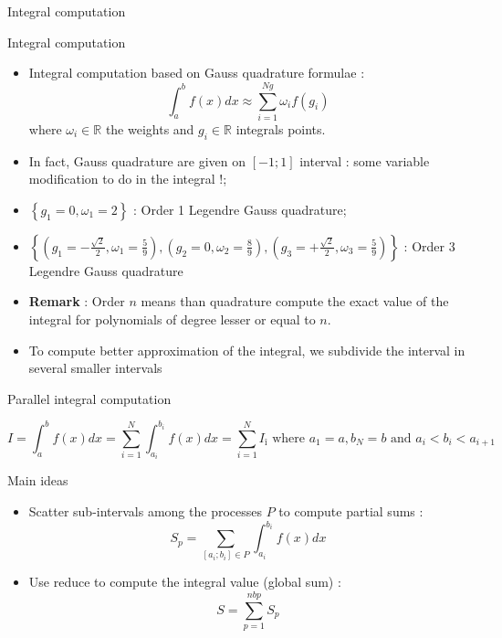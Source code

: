 \documentclass[compress,10pt,aspectratio=169]{beamer}
\begin{document}
\begin{frame}[fragile]{Integral computation}
  \scriptsize
  \begin{block}{\small Integral computation}
    \begin{itemize}
    \item Integral computation based on Gauss quadrature formulae :
      \[
      \int_{a}^{b}f(x)dx \approx \sum_{i=1}^{Ng} \omega_{i}f(g_{i})
      \]
      where $\omega_{i}\in\mathbb{R}$ the weights  and $g_{i}\in\mathbb{R}$ integrals points.
    \item In fact, Gauss quadrature are given on $[-1;1]$ interval : some variable modification to do in the integral !;
    \item $\left\{ g_{1}=0, \omega_{1}=2 \right\}$ : Order 1 Legendre Gauss quadrature;
    \item $\left\{ \left( g_{1}=-\frac{\sqrt{2}}{2}, \omega_{1}=\frac{5}{9} \right), \left( g_{2}=0, \omega_{2}=\frac{8}{9} \right), \left( g_{3}=+\frac{\sqrt{2}}{2}, \omega_{3}=\frac{5}{9} \right) \right\}$ : Order 3 Legendre Gauss quadrature
    \item \textbf{Remark} : Order $n$ means than quadrature compute the exact value of the integral for polynomials of degree lesser or equal to $n$.
    \item To compute better approximation of the integral, we subdivide the interval in several smaller intervals
    \end{itemize}
  \end{block}
\end{frame}

\begin{frame}[fragile]{Parallel integral computation}
  \scriptsize
  \begin{center}
    \[
    I = \int_{a}^{b}f(x)dx = \sum_{i=1}^{N}\int_{a_{i}}^{b_{i}}f(x)dx = \sum_{i=1}^{N} I_{î} \mbox{ where } a_{1}=a, b_{N} = b\mbox{ and } a_{i} < b_{i} < a_{i+1}
    \]
  \end{center}
  \begin{block}{\small Main ideas}
    \begin{itemize}
  \item Scatter sub-intervals among the processes $P$ to compute partial sums :
    \[
    S_{p} = \sum_{[a_{i};b_{i}] \in P} \int_{a_{i}}^{b_{i}} f(x)dx
    \]
  \item Use reduce to compute the integral value (global sum) :
    \[ S = \sum_{p=1}^{nbp} S_{p} \]
    \end{itemize}
  \end{block}
\end{frame}
\end{document}
